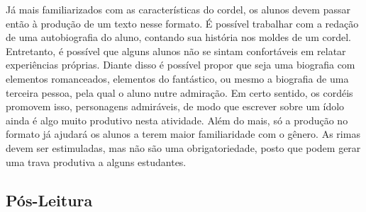 \documentclass[12pt]{extarticle}
\begin{document}


Já mais familiarizados com as características do cordel, os
alunos devem passar então à produção de um texto nesse formato. É
possível trabalhar com a redação de uma autobiografia do aluno, contando
sua história nos moldes de um cordel. Entretanto, é possível que alguns
alunos não se sintam confortáveis em relatar experiências próprias.
Diante disso é possível propor que seja uma biografia com elementos
romanceados, elementos do fantástico, ou mesmo a biografia de uma
terceira pessoa, pela qual o aluno nutre admiração. Em certo sentido, os
cordéis promovem isso, personagens admiráveis, de modo que escrever
sobre um ídolo ainda é algo muito produtivo nesta atividade. Além do
mais, só a produção no formato já ajudará os alunos a terem maior
familiaridade com o gênero. As rimas devem ser estimuladas, mas não são
uma obrigatoriedade, posto que podem gerar uma trava produtiva a alguns
estudantes.


\subsection{Pós-Leitura}
\end{document}
